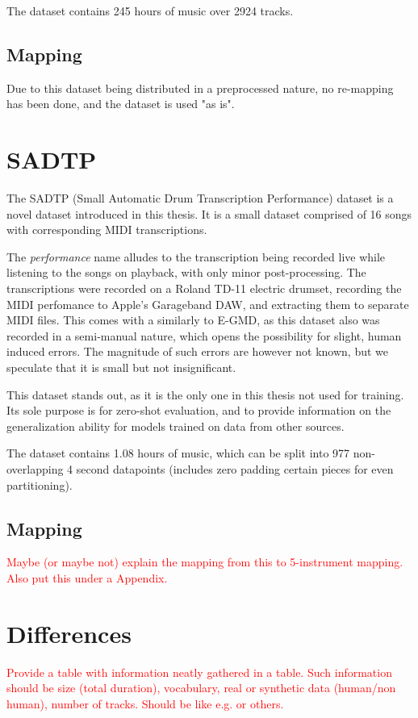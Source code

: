 The dataset contains 245 hours of music over 2924 tracks.

\subsection{Mapping}

Due to this dataset being distributed in a preprocessed nature, no re-mapping has been done, and the dataset is used "as is".

\section{SADTP}

The SADTP (Small Automatic Drum Transcription Performance) dataset is a novel dataset introduced in this thesis. It is a small dataset comprised of 16 songs with corresponding MIDI transcriptions. 

The \textit{performance} name alludes to the transcription being recorded live while listening to the songs on playback, with only minor post-processing. The transcriptions were recorded on a Roland TD-11 electric drumset, recording the MIDI perfomance to Apple's Garageband \gls{DAW}, and extracting them to separate MIDI files. This comes with a similarly to E-GMD, as this dataset also was recorded in a semi-manual nature, which opens the possibility for slight, human induced errors. The magnitude of such errors are however not known, but we speculate that it is small but not insignificant.

This dataset stands out, as it is the only one in this thesis not used for training. Its sole purpose is for zero-shot evaluation, and to provide information on the generalization ability for models trained on data from other sources.

The dataset contains 1.08 hours of music, which can be split into 977 non-overlapping 4 second datapoints (includes zero padding certain pieces for even partitioning).

\subsection{Mapping}

\textcolor{red}{Maybe (or maybe not) explain the mapping from this to 5-instrument mapping. Also put this under a Appendix.}

\section{Differences}

\textcolor{red}{Provide a table with information neatly gathered in a table. Such information should be size (total duration), vocabulary, real or synthetic data (human/non human), number of tracks. Should be like e.g. \cite{signals4040042,callender2020improving} or others.}